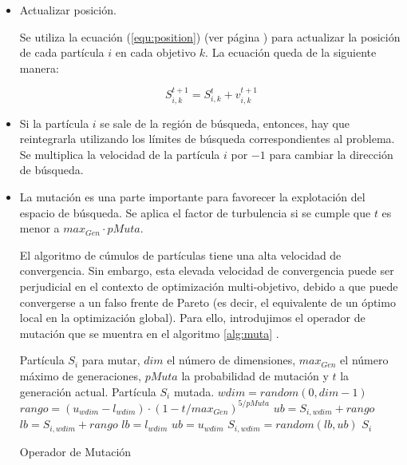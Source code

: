 \begin{enumerate}
\begin{enumerate}
\begin{itemize}
      \item Actualizar posici\'on. 
      
      Se utiliza la ecuaci\'on (\ref{equ:position}) (ver p\'agina \pageref{equ:position})
      para actualizar la posici\'on de cada part\'icula $i$ en cada objetivo $k$. La ecuaci\'on queda de la siguiente 
      manera:
      
      \[S^{t+1}_{i,k}=S^{t}_{i,k}+v^{t+1}_{i,k}\]
      
      \item Si la part\'icula $i$ se sale de la regi\'on de b\'usqueda, entonces, hay que reintegrarla utilizando los 
      l\'imites de b\'usqueda correspondientes al problema. Se multiplica la velocidad de la part\'icula $i$ por $-1$ 
      para cambiar la direcci\'on de b\'usqueda.  
      
      \item La mutaci\'on es una parte importante para favorecer la explotaci\'on del espacio de b\'usqueda.
      Se aplica el factor de turbulencia si se cumple que $t$ es menor a $max_{Gen} \cdot pMuta$.

    El algoritmo de c\'umulos de part\'iculas tiene una alta velocidad de convergencia. Sin embargo, esta elevada
    velocidad de convergencia puede ser perjudicial en el contexto de optimizaci\'on multi-objetivo, debido
    a que puede convergerse a un falso frente de Pareto (es decir, el equivalente de un \'optimo local en la 
    optimizaci\'on global). Para ello, introdujimos el operador de mutaci\'on que se muentra en el algoritmo \ref{alg:muta} 
    \cite{Coello04}.

    \begin{algorithm}
      \begin{algorithmic}[1]			
	\REQUIRE  Part\'icula $S_i$ para mutar, $dim$ el n\'umero de dimensiones, $max_{Gen}$ el n\'umero m\'aximo de generaciones,
	      $pMuta$ la probabilidad de mutaci\'on y $t$ la generaci\'on actual.
	\ENSURE Part\'icula $S_i$ mutada.
	  \STATE $wdim = random(0, dim-1)$
	  \STATE $rango = \left(u_{wdim} - l_{wdim}\right)\cdot \left(1 - t/max_{Gen} \right)^{5/pMuta}$
	  \STATE $ub = S_{i,wdim} + rango$
	  \STATE $lb = S_{i,wdim} + rango$
	    \STATE $lb = l_{wdim}$
	  \ENDIF
	    \STATE $ub = u_{wdim}$
	  \ENDIF
	  \STATE $S_{i,wdim} = random\left(lb,ub\right)$
	\ENDIF	
	\RETURN $S_i$
  \end{algorithmic}
  \caption{Operador de Mutaci\'on}
  \label{alg:muta}
  \end{algorithm}


\end{itemize}
\end{enumerate}
\end{enumerate}
